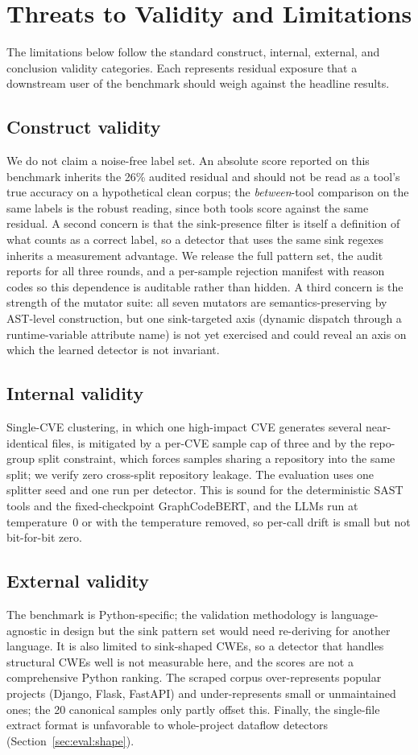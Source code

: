 \documentclass[conference]{IEEEtran}
\begin{document}
\section{Threats to Validity and Limitations}
The limitations below follow the standard construct, internal, external,
and conclusion validity categories. Each represents residual exposure that
a downstream user of the benchmark should weigh against the headline
results.

\subsection{Construct validity}
We do not claim a noise-free label set. An absolute score reported on
this benchmark inherits the 26\% audited residual and should not be read
as a tool's true accuracy on a hypothetical clean corpus; the
\emph{between}-tool comparison on the same labels is the robust reading,
since both tools score against the same residual. A second concern is
that the sink-presence filter is itself a definition of what counts as a
correct label, so a detector that uses the same sink regexes inherits a
measurement advantage. We release the full pattern set, the audit
reports for all three rounds, and a per-sample rejection manifest with
reason codes so this dependence is auditable rather than hidden. A third
concern is the strength of the mutator suite: all seven mutators are
semantics-preserving by AST-level construction, but one sink-targeted
axis (dynamic dispatch through a runtime-variable attribute name) is not
yet exercised and could reveal an axis on which the learned detector is
not invariant.

\subsection{Internal validity}
Single-CVE clustering, in which one high-impact CVE generates several
near-identical files, is mitigated by a per-CVE sample cap of three and
by the repo-group split constraint, which forces samples sharing a
repository into the same split; we verify zero cross-split repository
leakage. The evaluation uses one splitter seed and one run per detector.
This is sound for the deterministic SAST tools and the fixed-checkpoint
GraphCodeBERT, and the LLMs run at temperature~0 or with the temperature
removed, so per-call drift is small but not bit-for-bit zero.

\subsection{External validity}
The benchmark is Python-specific; the validation methodology is
language-agnostic in design but the sink pattern set would need
re-deriving for another language. It is also limited to sink-shaped
CWEs, so a detector that handles structural CWEs well is not measurable
here, and the scores are not a comprehensive Python ranking. The scraped
corpus over-represents popular projects (Django, Flask, FastAPI) and
under-represents small or unmaintained ones; the 20 canonical samples
only partly offset this. Finally, the single-file extract format is
unfavorable to whole-project dataflow detectors (Section~\ref{sec:eval:shape}).
\end{document}
